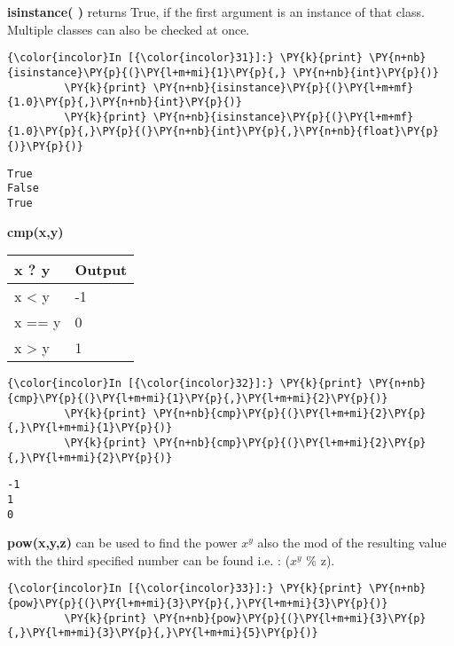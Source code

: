     \textbf{isinstance( )} returns True, if the first argument is an
instance of that class. Multiple classes can also be checked at once.

    \begin{Verbatim}[commandchars=\\\{\}]
{\color{incolor}In [{\color{incolor}31}]:} \PY{k}{print} \PY{n+nb}{isinstance}\PY{p}{(}\PY{l+m+mi}{1}\PY{p}{,} \PY{n+nb}{int}\PY{p}{)}
         \PY{k}{print} \PY{n+nb}{isinstance}\PY{p}{(}\PY{l+m+mf}{1.0}\PY{p}{,}\PY{n+nb}{int}\PY{p}{)}
         \PY{k}{print} \PY{n+nb}{isinstance}\PY{p}{(}\PY{l+m+mf}{1.0}\PY{p}{,}\PY{p}{(}\PY{n+nb}{int}\PY{p}{,}\PY{n+nb}{float}\PY{p}{)}\PY{p}{)}
\end{Verbatim}

    \begin{Verbatim}[commandchars=\\\{\}]
True
False
True
    \end{Verbatim}

    \textbf{cmp(x,y)}

\begin{longtable}[c]{@{}ll@{}}
\toprule
x ? y & Output\tabularnewline
\midrule
\endhead
x \textless{} y & -1\tabularnewline
x == y & 0\tabularnewline
x \textgreater{} y & 1\tabularnewline
\bottomrule
\end{longtable}

    \begin{Verbatim}[commandchars=\\\{\}]
{\color{incolor}In [{\color{incolor}32}]:} \PY{k}{print} \PY{n+nb}{cmp}\PY{p}{(}\PY{l+m+mi}{1}\PY{p}{,}\PY{l+m+mi}{2}\PY{p}{)}
         \PY{k}{print} \PY{n+nb}{cmp}\PY{p}{(}\PY{l+m+mi}{2}\PY{p}{,}\PY{l+m+mi}{1}\PY{p}{)}
         \PY{k}{print} \PY{n+nb}{cmp}\PY{p}{(}\PY{l+m+mi}{2}\PY{p}{,}\PY{l+m+mi}{2}\PY{p}{)}
\end{Verbatim}

    \begin{Verbatim}[commandchars=\\\{\}]
-1
1
0
    \end{Verbatim}

    \textbf{pow(x,y,z)} can be used to find the power \(x^y\) also the mod
of the resulting value with the third specified number can be found i.e.
: (\(x^y\) \% z).

    \begin{Verbatim}[commandchars=\\\{\}]
{\color{incolor}In [{\color{incolor}33}]:} \PY{k}{print} \PY{n+nb}{pow}\PY{p}{(}\PY{l+m+mi}{3}\PY{p}{,}\PY{l+m+mi}{3}\PY{p}{)}
         \PY{k}{print} \PY{n+nb}{pow}\PY{p}{(}\PY{l+m+mi}{3}\PY{p}{,}\PY{l+m+mi}{3}\PY{p}{,}\PY{l+m+mi}{5}\PY{p}{)}
\end{Verbatim}

